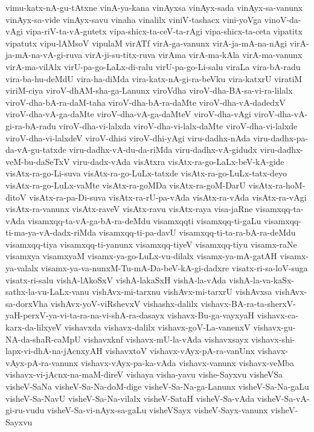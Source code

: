 {vimu-katx-nA-gu-tAtxne
vinA-ya-kana
vinAyxsa
vinAyx-sada
vinAyx-sa-vanunx
vinAyx-sa-vide
vinAyx-savu
vinaha
vinalilx
viniV-tashacx
vini-yoVga
vinoV-da-vAgi
vipa-riV-ta-vA-gutetx
vipa-shicx-ta-ceV-ta-rAgi
vipa-shicx-ta-ceta
vipatitx
vipatutx
vipu-lAMsoV
vipulaM
virATf
virA-ga-vanunx
virA-ja-mA-na-nAgi
virA-ja-mA-na-vA-gi-ruva
virA-ji-su-titx-ruva
virAma
virA-ma-kAla
virA-ma-vanunx
virA-ma-vilAlx
virU-pa-go-LaLx-di-ralu
virU-pa-go-Li-salu
viraLa
vira-bA-radu
vira-ba-hu-deMdU
vira-ha-diMda
vira-katx-nA-gi-ra-beVku
vira-katxrU
viratiM
viriM-ciya
viroV-dhAM-sha-ga-Lanunx
viroVdha
viroV-dha-BA-sa-vi-ra-lilalx
viroV-dha-bA-ra-daM-taha
viroV-dha-bA-ra-daMte
viroV-dha-vA-dadedxV
viroV-dha-vA-ga-daMte
viroV-dha-vA-ga-daMteV
viroV-dha-vAgi
viroV-dha-vA-gi-ra-bA-radu
viroV-dha-vi-lalxda
viroV-dha-vi-lalx-daMte
viroV-dha-vi-lalxde
viroV-dha-vi-lalxdeV
viroV-dhisi
viroV-dhi-yAgi
viru-dadhx-nAda
viru-dadhx-pa-da-vA-gu-tatxde
viru-dadhx-vA-du-da-riMda
viru-dadhx-vA-gidudx
viru-dadhx-veM-bu-daSeTxV
viru-dadx-vAda
visAtxra
visAtx-ra-go-LaLx-beV-kA-gide
visAtx-ra-go-Li-suva
visAtx-ra-go-LuLx-tatxde
visAtx-ra-go-LuLx-tatx-deyo
visAtx-ra-go-LuLx-vaMte
visAtx-ra-goMDa
visAtx-ra-goM-DarU
visAtx-ra-hoM-ditoV
visAtx-ra-pa-Di-suva
visAtx-ra-rU-pa-vAda
visAtx-ra-vAda
visAtx-ra-vAgi
visAtx-ra-vanunx
visAtx-raveV
visAtx-ravu
visAtx-raya
visa-jaRne
visamxqq-ta-vAda
visamxqq-ta-vA-ga-bA-ra-deMdu
visamxqqti
visamxqq-ti-gaLu
visamxqq-ti-ma-ya-vA-dadx-riMda
visamxqq-ti-pa-davU
visamxqq-ti-ta-ra-bA-ra-deMdu
visamxqq-tiya
visamxqq-ti-yanunx
visamxqq-tiyeV
visamxqq-tiyu
visamx-raNe
visamxya
visamxyaM
visamx-ya-go-LuLx-vu-dilalx
visamx-ya-mA-gatAH
visamx-ya-valalx
visamx-ya-va-nunxM-Tu-mA-Da-beV-kA-gi-dadxre
visatx-ri-sa-loV-suga
visatx-ri-salu
vishA-lAkoSxV
vishA-lakaSxH
vishA-la-vAda
vishA-la-va-kaSx-sathx-la-vu-LaLx-vanu
vishAvx-mi-tarxnu
vishAvx-mi-tarxrU
vishAvxsa
vishAvx-sa-dorxVha
vishAvx-yoV-viRshevxV
vishashx-dalilx
vishavx-BA-ra-ta-sherxV-yaH-perxV-ya-vi-ta-ra-na-vi-shA-ra-dasayx
vishavx-Bu-ga-vayxyaH
vishavx-ca-karx-da-lilxyeV
vishavxda
vishavx-dalilx
vishavx-goV-La-vanenxV
vishavx-gu-NA-da-shaR-caMpU
vishavxknf
vishavx-mU-la-vAda
vishavxsayx
vishavx-shi-lapx-vi-dhA-na-jAcnxyAH
vishavxtoV
vishavx-vAyx-pA-ra-vanUnx
vishavx-vAyx-pA-ra-vanunx
vishavx-vAyx-pa-ka-vAda
vishavx-vanunx
vishavx-veMba
vishavx-vi-jAcnx-na-maM-direV
vishaya
visha-yavu
vishe-Sayxvu
visheVSa
visheV-SaNa
visheV-Sa-Na-doM-dige
visheV-Sa-Na-ga-Lanunx
visheV-Sa-Na-gaLu
visheV-Sa-NavU
visheV-Sa-Na-vilalx
visheV-SataH
visheV-Sa-vAda
visheV-Sa-vA-gi-ru-vudu
visheV-Sa-vi-nAyx-sa-gaLu
visheVSayx
visheV-Sayx-vanunx
visheV-Sayxvu
}
